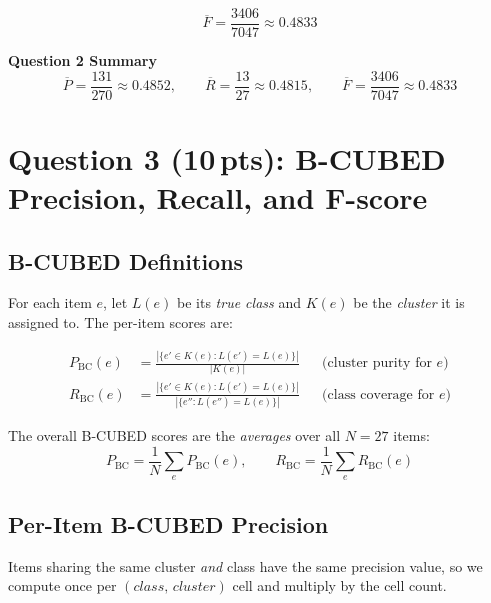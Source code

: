 \documentclass[11pt, a4paper]{article}
\begin{document}
\begin{mathbox}
\[
  \overline{F} = \frac{3406}{7047} \approx 0.4833
\]
\end{mathbox}

\begin{insightbox}
\textbf{Question 2 Summary}
\[
  \overline{P} = \frac{131}{270} \approx 0.4852, \qquad
  \overline{R} = \frac{13}{27}   \approx 0.4815, \qquad
  \overline{F} = \frac{3406}{7047} \approx 0.4833
\]
\end{insightbox}

\section{Question 3 (10\,pts): B-CUBED Precision, Recall, and F-score}

\subsection{B-CUBED Definitions}

For each item $e$, let $L(e)$ be its \emph{true class} and $K(e)$ be the
\emph{cluster} it is assigned to. The per-item scores are:

\begin{align*}
  P_{\mathrm{BC}}(e)
  &= \frac{|\{e' \in K(e) : L(e') = L(e)\}|}{|K(e)|}
  &&\text{(cluster purity for } e\text{)} \\[8pt]
  R_{\mathrm{BC}}(e)
  &= \frac{|\{e' \in K(e) : L(e') = L(e)\}|}{|\{e'' : L(e'') = L(e)\}|}
  &&\text{(class coverage for } e\text{)}
\end{align*}

The overall B-CUBED scores are the \emph{averages} over all $N = 27$ items:
\[
  P_{\mathrm{BC}} = \frac{1}{N}\sum_{e} P_{\mathrm{BC}}(e), \qquad
  R_{\mathrm{BC}} = \frac{1}{N}\sum_{e} R_{\mathrm{BC}}(e)
\]

\subsection{Per-Item B-CUBED Precision}

Items sharing the same cluster \emph{and} class have the same precision value,
so we compute once per $(class,\,cluster)$ cell and multiply by the cell count.
\end{document}
